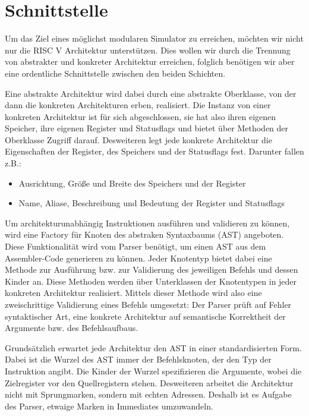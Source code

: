 \section{Schnittstelle}

Um das Ziel eines möglichst modularen Simulator zu erreichen, möchten wir nicht nur die RISC V Architektur unterstützen. Dies wollen wir durch die Trennung von abstrakter und konkreter Architektur erreichen, folglich benötigen wir aber eine ordentliche Schnittstelle zwischen den beiden Schichten.

Eine abstrakte Architektur wird dabei durch eine abstrakte Oberklasse, von der dann die konkreten Architekturen erben, realisiert. Die Instanz von einer konkreten Architektur ist für sich abgeschlossen, sie hat also ihren eigenen Speicher, ihre eigenen Register und Statusflags und bietet über Methoden der Oberklasse Zugriff darauf. Desweiteren legt jede konkrete Architektur die Eigenschaften der Register, des Speichers und der Statusflags fest. Darunter fallen z.B.:

\begin{itemize}
\item Ausrichtung, Größe und Breite des Speichers und der Register
\item Name, Aliase, Beschreibung und Bedeutung der Register und Statusflags
\end{itemize}

Um architekturunabhängig Instruktionen ausführen und validieren zu können, wird eine Factory für Knoten des abstraken Syntaxbaums (AST) angeboten. Diese Funktionalität wird vom Parser benötigt, um einen AST aus dem Assembler-Code generieren zu können. Jeder Knotentyp bietet dabei eine Methode zur Ausführung bzw. zur Validierung des jeweiligen Befehls und dessen Kinder an. Diese Methoden werden über Unterklassen der Knotentypen in jeder konkreten Architektur realisiert. Mittels dieser Methode wird also eine zweischrittige Validierung eines Befehls umgesetzt: Der Parser prüft auf Fehler syntaktischer Art, eine konkrete Architektur auf semantische Korrektheit der Argumente bzw. des Befehlsaufbaus.

Grundsätzlich erwartet jede Architektur den AST in einer standardisierten Form. Dabei ist die Wurzel des AST immer der Befehlsknoten, der den Typ der Instruktion angibt. Die Kinder der Wurzel spezifizieren die Argumente, wobei die Zielregister vor den Quellregistern stehen. Desweiteren arbeitet die Architektur nicht mit Sprungmarken, sondern mit echten Adressen. Deshalb ist es Aufgabe des Parser, etwaige Marken in Immediates umzuwandeln.
